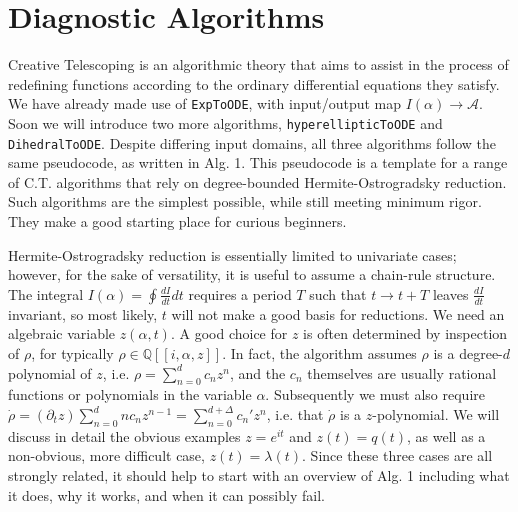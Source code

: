 \documentclass[nofootinbib,preprint]{revtex4-1}
\begin{document}
\section{Diagnostic Algorithms}
Creative Telescoping is an algorithmic theory that aims to assist in the process 
of redefining functions according to the ordinary differential equations they satisfy.
We have already made use of \texttt{ExpToODE}, with input/output map 
$I(\alpha) \rightarrow \mathcal{A}$. Soon we will introduce two more 
algorithms, \texttt{hyperellipticToODE} and \texttt{DihedralToODE}. 
Despite differing input domains, all three algorithms follow the same pseudocode, 
as written in Alg. 1. This pseudocode is a template for a range of C.T. algorithms 
that rely on degree-bounded Hermite-Ostrogradsky reduction\cite{BRONSTEIN2005}. Such algorithms
are the simplest possible, while still meeting minimum rigor. They make a good
starting place for curious beginners. 

Hermite-Ostrogradsky reduction is essentially limited to univariate cases; however,
for the sake of versatility, it is useful to assume a chain-rule structure. The 
integral $I(\alpha) = \oint \frac{dI}{dt}dt$ requires a period $T$ such that 
$t\rightarrow t+T$ leaves $\frac{dI}{dt}$ invariant, so most likely, $t$ will not
make a good basis for reductions. We need an algebraic variable $z(\alpha,t)$. 
A good choice for $z$ is often determined by inspection of $\rho$, for typically 
$\rho \in \mathbb{Q}[\![i,\alpha,z]\!]$. In fact, the algorithm assumes $\rho$ is a 
degree-$d$ polynomial of $z$, i.e. $\rho = \sum_{n=0}^d c_n z^n$, and the $c_n$ 
themselves are usually rational functions or polynomials in the variable $\alpha$. 
Subsequently we must also require 
$\dot{\rho}=(\partial_t z) \sum_{n=0}^d n c_n z^{n-1}=\sum_{n=0}^{d+\Delta}c_n'z^n$, 
i.e. that $\dot{\rho}$ is a $z$-polynomial. We will discuss in detail the obvious 
examples $z=e^{it}$ and $z(t)=q(t)$, as well as a non-obvious, more difficult case,
$z(t)=\lambda(t)$. Since these three cases are all strongly related, it should help
to start with an overview of Alg. 1 including what it does, why it works, and when 
it can possibly fail. 
\end{document}
